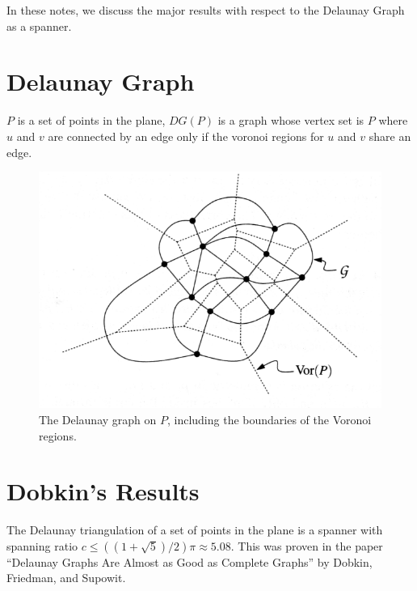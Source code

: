 \documentclass{tufte-handout}
\title{\DocTitle}
\author{\DocAuthor}
\begin{document}
\maketitle
\vspace{1cm}

In these notes, we discuss the major results with respect to the
Delaunay Graph as a spanner.

\part{Delaunay Graph}

$P$ is a set of points in the plane, $DG(P)$ is a graph whose vertex
set is $P$ where $u$ and $v$ are connected by an edge only if the
voronoi regions for $u$ and $v$ share an edge.

\begin{figure}
  \includegraphics{figures/delaunay_graph.png}
  \caption{The Delaunay graph on $P$, including the boundaries of the
    Voronoi regions.}
\end{figure}

\part{Dobkin's Results}

The Delaunay triangulation of a set of points in the plane is a
spanner with spanning ratio $c \le ((1 + \sqrt{5})/2)\pi \approx
5.08$.  This was proven in the paper ``Delaunay Graphs Are Almost as
Good as Complete Graphs'' by Dobkin, Friedman, and Supowit.  
\cite{Dobkin:1987} \cite{Dobkin:1990}
\end{document}
